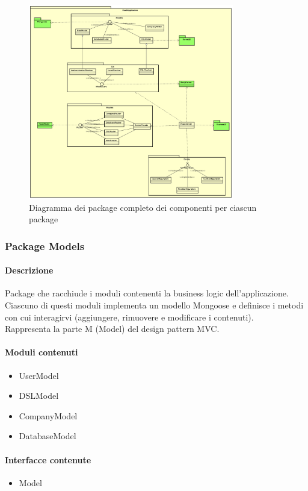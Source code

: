 \begin{figure}[H]
\centering
\includegraphics[width=0.8\textwidth]{res/sections/backend/collegamenti.png}
\caption{Diagramma dei package completo dei componenti per ciascun package}
\end{figure}

\subsubsection{Package Models}
\paragraph*{Descrizione}
Package che racchiude i moduli contenenti la business logic dell'applicazione. Ciascuno di questi moduli implementa un modello Mongoose e definisce i metodi con cui interagirvi (aggiungere, rimuovere e modificare i contenuti). \\
Rappresenta la parte M (Model) del design pattern MVC.

\paragraph*{Moduli contenuti}
\begin{itemize}
\item UserModel
\item DSLModel
\item CompanyModel
\item DatabaseModel
\end{itemize}

\paragraph*{Interfacce contenute}
\begin{itemize}
\item Model
\end{itemize}

